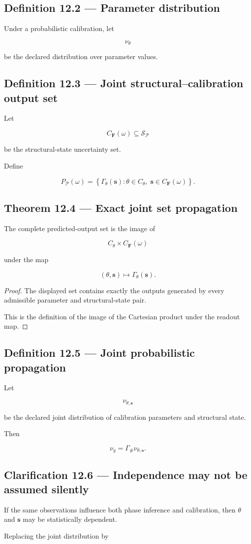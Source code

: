 \documentclass[11pt,oneside,openany]{book}
\newcommand{\PCsubsection}[1]{%
  \subsection*{#1}%
}
\begin{document}
\PCsubsection{Definition 12.2 --- Parameter distribution}

Under a probabilistic calibration, let

\[
\nu_\theta
\]

be the declared distribution over parameter values.

\PCsubsection{Definition 12.3 --- Joint structural–calibration output set}

Let

\[
C_{\mathbf F}(\omega) \subseteq \mathcal S_{\mathcal P}
\]

be the structural-state uncertainty set.

Define

\[
\boxed{ P_{\mathcal P}(\omega) = \left\{ \Gamma_\theta(\mathbf s): \theta\in C_\theta,\; \mathbf s\in C_{\mathbf F}(\omega) \right\}. }
\]

\PCsubsection{Theorem 12.4 --- Exact joint set propagation}

The complete predicted-output set is the image of

\[
C_\theta\times C_{\mathbf F}(\omega)
\]

under the map

\[
(\theta,\mathbf s) \mapsto \Gamma_\theta(\mathbf s).
\]

\begin{proof}
The displayed set contains exactly the outputs generated by every admissible parameter and structural-state pair.

This is the definition of the image of the Cartesian product under the readout map.

\end{proof}

\PCsubsection{Definition 12.5 --- Joint probabilistic propagation}

Let

\[
\nu_{\theta,\mathbf s}
\]

be the declared joint distribution of calibration parameters and structural state.

Then

\[
\boxed{ \nu_y = \Gamma_{\#}\nu_{\theta,\mathbf s}. }
\]

\PCsubsection{Clarification 12.6 --- Independence may not be assumed silently}

If the same observations influence both phase inference and calibration, then \(\theta\) and \(\mathbf s\) may be statistically dependent.

Replacing the joint distribution by
\end{document}
